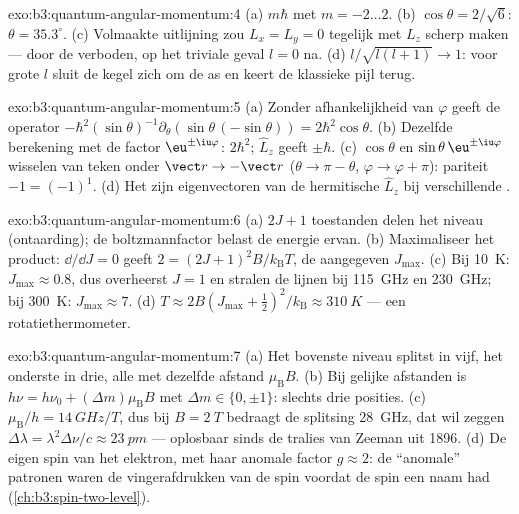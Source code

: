 \begin{solution}{exo:b3:quantum-angular-momentum:4}
(a) $m\hbar$ met $m = -2 \dots 2$. (b) $\cos\theta = 2/\sqrt6$:
$\theta = 35.3^\circ$. (c) Volmaakte uitlijning zou $L_x = L_y
= 0$
tegelijk met $L_z$ scherp maken --- door de  verboden, op het
triviale geval $l = 0$ na. (d) $l/\sqrt{l(l+1)} \to 1$: voor grote $l$
sluit de kegel zich om de as en keert de klassieke pijl terug.
\end{solution}

\begin{solution}{exo:b3:quantum-angular-momentum:5}
(a) Zonder afhankelijkheid van $\varphi$ geeft de operator
$-\hbar^2(\sin\theta)^{-1}\partial_\theta(\sin\theta\,(-\sin\theta))
= 2\hbar^2\cos\theta$. (b) Dezelfde berekening met de factor
$\eu^{\pm\iu\varphi}$:  $2\hbar^2$; $\hat L_z$ geeft
$\pm\hbar$. (c) $\cos\theta$ en $\sin\theta\,\eu^{\pm\iu
\varphi}$
wisselen van teken onder $\vect r \to -\vect r$ ($\theta \to \pi
- \theta$, $\varphi \to \varphi + \pi$): pariteit $-1 = (-1)^1$. (d)
Het zijn eigenvectoren van de hermitische $\hat L_z$ bij verschillende
.
\end{solution}

\begin{solution}{exo:b3:quantum-angular-momentum:6}
(a) $2J + 1$ toestanden delen het niveau (ontaarding); de boltzmannfactor
belast de energie ervan. (b) Maximaliseer het product: $\dd/\dd J = 0$
geeft $2 = (2J+1)^2B/k_{\text{B}}T$, de aangegeven $J_{\max}$. (c) Bij
\qty{10}{K}: $J_{\max} \approx 0.8$, dus overheerst $J = 1$ en stralen de
lijnen bij \qty{115}{GHz} en \qty{230}{GHz}; bij \qty{300}{K}: $J_{\max} \approx 7$. (d) $T \approx 2B(J_{\max} + \tfrac12)^2/
k_{\text{B}} \approx \qty{310}{K}$ --- een rotatiethermometer.
\end{solution}

\begin{solution}{exo:b3:quantum-angular-momentum:7}
(a) Het bovenste niveau splitst in vijf, het onderste in drie, alle met
dezelfde afstand $\mu_{\text{B}}B$. (b) Bij gelijke afstanden is $h\nu = h\nu_0 + (\Delta m)\mu_{\text{B}}B$ met $\Delta m \in \{0,
\pm1\}$:
slechts drie posities. (c) $\mu_{\text{B}}/h = \qty{14}{GHz/T}$, dus bij $B = \qty{2}{T}$
bedraagt de splitsing \qty{28}{GHz}, dat wil zeggen $\Delta\lambda =
\lambda^2\Delta\nu/c \approx \qty{23}{pm}$ --- oplosbaar sinds de
tralies van Zeeman uit 1896.
(d) De eigen spin van het elektron, met haar anomale factor $g \approx
2$: de ``anomale'' patronen waren de vingerafdrukken van de spin voordat
de spin een naam had (\cref{ch:b3:spin-two-level}).
\end{solution}

